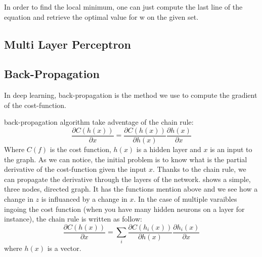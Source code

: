 		In order to find the local minimum, one can just compute the last line of the equation and retrieve the optimal value for w on the given set.


	\subsection{Multi Layer Perceptron}


	\subsection{Back-Propagation}
		In deep learning, back-propagation is the method we use to compute the gradient of the cost-function.

		back-propagation algorithm take adventage of the chain rule:
		\begin{equation}
			\frac{\partial C(h(x))}{\partial x} = \frac{\partial C(h(x))}{\partial h(x)} \frac{\partial h(x)}{\partial x}
		\end{equation}
		Where $C(f)$ is the cost function, $h(x)$ is a hidden layer and $x$ is an input to the graph. As we can notice, the initial problem is to know what is the partial derivative of the cost-function given the input $x$. Thanks to the chain rule, we can propagate the derivative through the layers of the network.  shows a simple, three nodes, directed graph. It has the functions mention above and we see how a change in $z$ is influanced by a change in $x$. In the case of multiple varaibles ingoing the cost function (when you have many hidden neurons on a layer for instance), the chain rule is written as follow:
		\begin{equation}
			\frac{\partial C(h(x))}{\partial x} = \sum_i\frac{\partial C(h_i(x))}{\partial h(x)} \frac{\partial h_i(x)}{\partial x}
		\end{equation}
		where $h(x)$ is a vector.


		\usetikzlibrary{calc,trees,positioning,arrows,chains,shapes.geometric,%
		decorations.pathreplacing,decorations.pathmorphing,shapes,%
		matrix,shapes.symbols}


